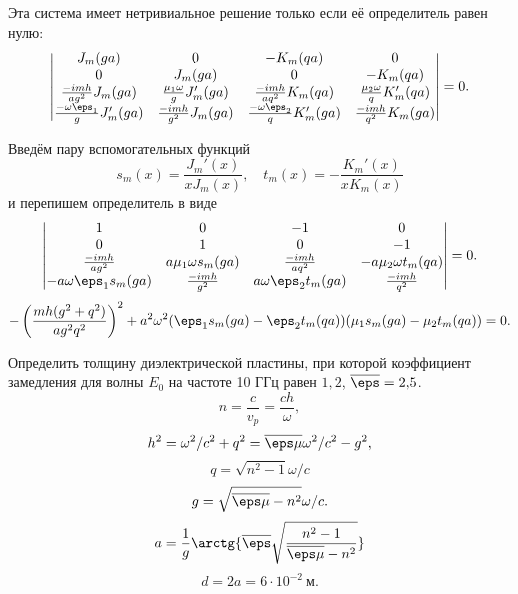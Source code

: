 Эта система имеет нетривиальное решение только если её определитель равен нулю:
\[
	\begin{vmatrix}
		J_m(ga) & 0 & -K_m(qa) & 0 \\
		0 & J_m(ga) & 0 & -K_m(qa) \\
		\frac{-imh}{ag^2}J_m(ga) & \frac{\mu_1\omega}{g}J_m'(ga) & \frac{-imh}{aq^2}K_m(qa) & \frac{\mu_2\omega}{q}K_m'(qa)\\
		\frac{-\omega\eps_1}{g}J_m'(ga) & \frac{-imh}{g^2}J_m(ga) & \frac{-\omega\eps_2}{q}K_m'(ga) & \frac{-imh}{q^2}K_m(ga)\\
	\end{vmatrix} = 0.
\]

Введём пару вспомогательных функций
\[
	s_m(x) = \frac{J_m'(x)}{xJ_m(x)},\quad
	t_m(x) = -\frac{K_m'(x)}{xK_m(x)}
\]
и перепишем определитель в виде
\[
	\begin{vmatrix}
		1 & 0 & -1 & 0 \\
		0 & 1 & 0 & -1 \\
		\frac{-imh}{ag^2} & a\mu_1\omega s_m(ga) & \frac{-imh}{aq^2} & -a\mu_2\omega t_m(qa)\\
		-a\omega\eps_1 s_m(ga) & \frac{-imh}{g^2} & a\omega\eps_2t_m(ga) & \frac{-imh}{q^2}\\
	\end{vmatrix} = 0.
\]
\[
	-\left(\frac{mh(g^2 + q^2)}{ag^2q^2}\right)^2 + a^2\omega^2(\eps_1s_m(ga) - \eps_2t_m(qa))(\mu_1 s_m(ga) - \mu_2 t_m(qa)) = 0.
\]

Определить толщину диэлектрической пластины, при которой коэффициент замедления для волны \(E_0\) на частоте 10 ГГц равен \( 1,\!2 \), \(\overline{\eps} = 2,\!5\).
\[
	n = \frac{c}{v_p} = \frac{ch}{\omega},
\]
\[
	h^2 = \omega^2/c^2 + q^2 = \overline{\eps\mu}\omega^2/c^2 - g^2,
\]
\[
	q = \sqrt{n^2 - 1}\omega/ c
\]
\[
	g = \sqrt{\overline{\eps\mu} - n^2}\omega / c. 
\]
\[
	a = \frac{1}{g}\arctg{\overline{\eps}\sqrt{\frac{n^2-1}{\overline{\eps\mu} - n^2}}}
\]
\[
	d = 2a = 6\cdot10^{-2}~\text{м}.
\]